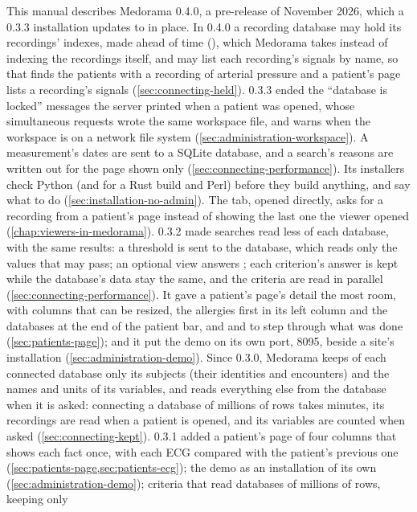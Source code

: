 This manual describes Medorama 0.4.0, a pre-release of November 2026, which a 0.3.3
installation updates to in place. In 0.4.0 a recording database may hold its recordings' indexes,
made ahead of time (), which Medorama takes instead of indexing the
recordings itself, and may list each recording's signals by name, so that 
finds the patients with a recording of arterial pressure and a patient's page lists a recording's
signals (\cref{sec:connecting-held}). 0.3.3 ended the
``database is locked'' messages the server printed when a patient was opened, whose simultaneous
requests wrote the same workspace file, and  warns when the workspace is on a network file system
(\cref{sec:administration-workspace}). A measurement's dates are sent to a SQLite database, and a
search's reasons are written out for the page shown only (\cref{sec:connecting-performance}).
Its installers check Python (and for a Rust build  and Perl) before they build anything, and say what to do
(\cref{sec:installation-no-admin}). The  tab, opened directly, asks for a
recording from a patient's page instead of showing the last one the viewer opened
(\cref{chap:viewers-in-medorama}). 0.3.2 made searches read less of each database, with the
same results: a threshold is sent to the database, which reads only the values that may pass; an
optional  view answers ; each criterion's answer is kept while the
database's data stay the same, and the criteria are read in parallel
(\cref{sec:connecting-performance}). It gave a patient's page's detail the most room, with
columns that can be resized, the allergies first in its left column and the databases at the end
of the patient bar, and \key{$\uparrow$} and \key{$\downarrow$} to step through what was done
(\cref{sec:patients-page}); and it put the demo on its own port, 8095, beside a site's
installation (\cref{sec:administration-demo}). Since 0.3.0, Medorama keeps
of each connected database only its subjects (their identities and encounters) and the names and
units of its variables, and reads everything else from the database when it is asked: connecting
a database of millions of rows takes minutes, its recordings are read when a patient is opened,
and its variables are counted when asked (\cref{sec:connecting-kept}). 0.3.1 added a patient's
page of four columns that shows each fact once, with each ECG compared with the patient's
previous one (\cref{sec:patients-page,sec:patients-ecg}); the demo as an installation of its own
(\cref{sec:administration-demo}); criteria that read databases of millions of rows, keeping only
